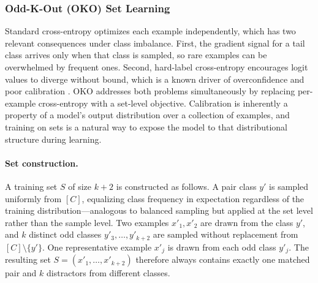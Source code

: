 \documentclass[11pt]{article}
\begin{document}
\subsubsection{Odd-K-Out (OKO) Set Learning}
Standard cross-entropy optimizes each example independently, which has two relevant consequences under class imbalance. First, the gradient signal for a tail class arrives only when that class is sampled, so rare examples can be overwhelmed by frequent ones. Second, hard-label cross-entropy encourages logit values to diverge without bound, which is a known driver of overconfidence and poor calibration \citep{guo2017calibration}. OKO \citep{muttenthaler2024setLearning} addresses both problems simultaneously by replacing per-example cross-entropy with a set-level objective. Calibration is inherently a property of a model's output distribution over a collection of examples, and training on sets is a natural way to expose the model to that distributional structure during learning.

\paragraph{Set construction.}
A training set $S$ of size $k+2$ is constructed as follows. A pair class $y'$ is sampled uniformly from $[C]$, equalizing class frequency in expectation regardless of the training distribution---analogous to balanced sampling but applied at the set level rather than the sample level. Two examples $x'_1,x'_2$ are drawn from the class $y'$, and $k$ distinct odd classes $y'_3,\ldots,y'_{k+2}$ are sampled without replacement from $[C]\setminus\{y'\}$. One representative example $x'_{j}$ is drawn from each odd class $y'_j$. The resulting set $S=(x'_1,\ldots,x'_{k+2})$ therefore always contains exactly one matched pair and $k$ distractors from different classes.
\end{document}
